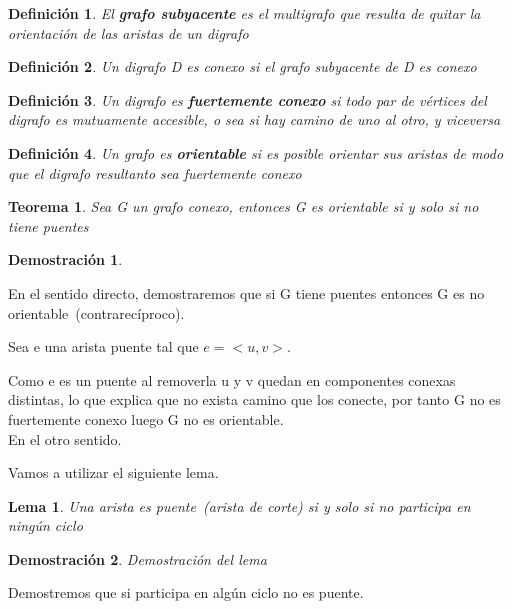 \documentclass[a4paper,1pt]{report}
\newtheorem*{teo}{Teorema}
\newtheorem*{dem}{Demostración}
\newtheorem*{dfn}{Definición}
\newtheorem*{lem}{Lema}
\begin{document}
\begin{dfn}
 El \textbf{grafo subyacente} es el multigrafo que resulta de quitar la orientación de las aristas de un digrafo
\end{dfn}

\begin{dfn}
 Un digrafo D es conexo si el grafo subyacente de D es conexo
\end{dfn}

\begin{dfn}
 Un digrafo es \textbf{fuertemente conexo} si todo par de vértices del digrafo es mutuamente accesible, o sea si hay camino de uno al otro, y viceversa
\end{dfn}

\begin{dfn}
 Un grafo es \textbf{orientable} si es posible orientar sus aristas de modo que el digrafo resultanto sea fuertemente conexo
\end{dfn}

\begin{teo}
 Sea G un grafo conexo, entonces G es orientable si y solo si no tiene puentes 
\end{teo}

\begin{dem}
 
\end{dem}



En el sentido directo, demostraremos que si G tiene puentes entonces G es no orientable~(contrarecíproco).

Sea e una arista puente tal que $e=<u,v>$.

Como e es un puente al removerla u y v quedan en componentes conexas distintas, lo que explica que no exista camino que los conecte, por tanto  G no es fuertemente conexo luego G no es orientable. \\

En el otro sentido.

Vamos a utilizar el siguiente lema.

\begin{lem}
 Una arista es puente~(arista de corte) si y solo si no participa en ningún ciclo
\end{lem}

\begin{dem}
Demostración del lema 
\end{dem}


Demostremos que si participa en algún ciclo no es puente.
\end{document}
